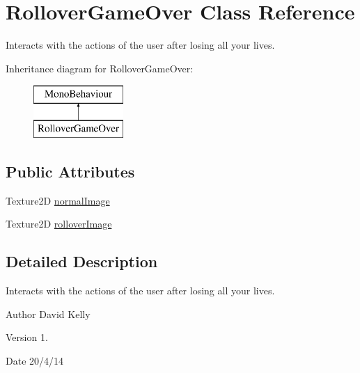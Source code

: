 \hypertarget{class_rollover_game_over}{\section{Rollover\-Game\-Over Class Reference}
\label{class_rollover_game_over}
}


Interacts with the actions of the user after losing all your lives.  


Inheritance diagram for Rollover\-Game\-Over\-:\begin{figure}[H]
\begin{center}
\leavevmode
\includegraphics[height=2.000000cm]{class_rollover_game_over}
\end{center}
\end{figure}
\subsection*{Public Attributes}
\begin{DoxyCompactItemize}
\item 
Texture2\-D \hyperlink{class_rollover_game_over_ab3bb0aa666cbb2d3d5b75de7915bbaed}{normal\-Image}
\item 
Texture2\-D \hyperlink{class_rollover_game_over_a604a75ebfbcb070218d1584955d5fe76}{rollover\-Image}
\end{DoxyCompactItemize}


\subsection{Detailed Description}
Interacts with the actions of the user after losing all your lives. 

\begin{DoxyAuthor}{Author}
David Kelly 
\end{DoxyAuthor}
\begin{DoxyVersion}{Version}
1. 
\end{DoxyVersion}
\begin{DoxyDate}{Date}
20/4/14 
\end{DoxyDate}


